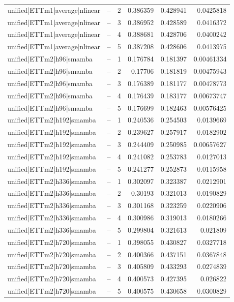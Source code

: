 \begin{longtable}{llrrrr}
unified|ETTm1|average|nlinear & -- & 2 & 0.386359 & 0.428941 & 0.0425818 \\
unified|ETTm1|average|nlinear & -- & 3 & 0.386952 & 0.428589 & 0.0416372 \\
unified|ETTm1|average|nlinear & -- & 4 & 0.388681 & 0.428706 & 0.0400242 \\
unified|ETTm1|average|nlinear & -- & 5 & 0.387208 & 0.428606 & 0.0413975 \\
unified|ETTm2|h96|smamba & -- & 1 & 0.176784 & 0.181397 & 0.00461334 \\
unified|ETTm2|h96|smamba & -- & 2 & 0.17706 & 0.181819 & 0.00475943 \\
unified|ETTm2|h96|smamba & -- & 3 & 0.176389 & 0.181177 & 0.00478773 \\
unified|ETTm2|h96|smamba & -- & 4 & 0.176439 & 0.183177 & 0.00673747 \\
unified|ETTm2|h96|smamba & -- & 5 & 0.176699 & 0.182463 & 0.00576425 \\
unified|ETTm2|h192|smamba & -- & 1 & 0.240536 & 0.254503 & 0.0139669 \\
unified|ETTm2|h192|smamba & -- & 2 & 0.239627 & 0.257917 & 0.0182902 \\
unified|ETTm2|h192|smamba & -- & 3 & 0.244409 & 0.250985 & 0.00657627 \\
unified|ETTm2|h192|smamba & -- & 4 & 0.241082 & 0.253783 & 0.0127013 \\
unified|ETTm2|h192|smamba & -- & 5 & 0.241277 & 0.252873 & 0.0115958 \\
unified|ETTm2|h336|smamba & -- & 1 & 0.302097 & 0.323387 & 0.0212901 \\
unified|ETTm2|h336|smamba & -- & 2 & 0.30193 & 0.321013 & 0.0190829 \\
unified|ETTm2|h336|smamba & -- & 3 & 0.301168 & 0.323259 & 0.0220906 \\
unified|ETTm2|h336|smamba & -- & 4 & 0.300986 & 0.319013 & 0.0180266 \\
unified|ETTm2|h336|smamba & -- & 5 & 0.299804 & 0.321613 & 0.021809 \\
unified|ETTm2|h720|smamba & -- & 1 & 0.398055 & 0.430827 & 0.0327718 \\
unified|ETTm2|h720|smamba & -- & 2 & 0.400366 & 0.437151 & 0.0367848 \\
unified|ETTm2|h720|smamba & -- & 3 & 0.405809 & 0.433293 & 0.0274839 \\
unified|ETTm2|h720|smamba & -- & 4 & 0.400573 & 0.427395 & 0.026822 \\
unified|ETTm2|h720|smamba & -- & 5 & 0.400575 & 0.430658 & 0.0300829 \\

\end{longtable}
